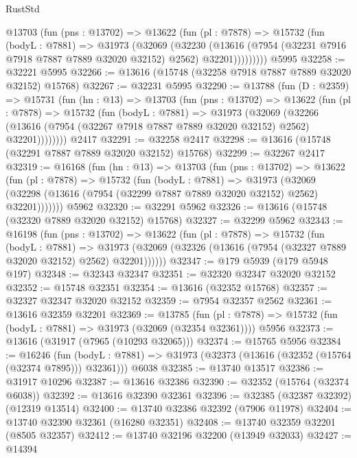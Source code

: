 \begin{lexlean}{RustStd}
\begin{coremodule}
        @13703
          (fun (pns : @13702) =>
          @13622
            (fun (pl : @7878) =>
            @15732
              (fun (bodyL : @7881) =>
              @31973
                (@32069
                  (@32230
                    (@13616
                      (@7954 (@32231 @7916 @7918 @7887 @7889 @32020 @32152) @2562)
                      @32201)))))))))
    @5995
@32258 := @32221 @5995
@32266 := @13616 (@15748 (@32258 @7918 @7887 @7889 @32020 @32152) @15768)
@32267 := @32231 @5995
@32290 := @13788
    (fun (D : @2359) =>
    @15731
      (fun (hn : @13) =>
      @13703
        (fun (pns : @13702) =>
        @13622
          (fun (pl : @7878) =>
          @15732
            (fun (bodyL : @7881) =>
            @31973
              (@32069
                (@32266
                  (@13616 (@7954 (@32267 @7918 @7887 @7889 @32020 @32152) @2562) @32201))))))))
    @2417
@32291 := @32258 @2417
@32298 := @13616 (@15748 (@32291 @7887 @7889 @32020 @32152) @15768)
@32299 := @32267 @2417
@32319 := @16168
    (fun (hn : @13) =>
    @13703
      (fun (pns : @13702) =>
      @13622
        (fun (pl : @7878) =>
        @15732
          (fun (bodyL : @7881) =>
          @31973
            (@32069 (@32298 (@13616 (@7954 (@32299 @7887 @7889 @32020 @32152) @2562) @32201)))))))
    @5962
@32320 := @32291 @5962
@32326 := @13616 (@15748 (@32320 @7889 @32020 @32152) @15768)
@32327 := @32299 @5962
@32343 := @16198
    (fun (pns : @13702) =>
    @13622
      (fun (pl : @7878) =>
      @15732
        (fun (bodyL : @7881) =>
        @31973 (@32069 (@32326 (@13616 (@7954 (@32327 @7889 @32020 @32152) @2562) @32201))))))
@32347 := @179 @5939 (@179 @5948 @197)
@32348 := @32343 @32347
@32351 := @32320 @32347 @32020 @32152
@32352 := @15748 @32351
@32354 := @13616 (@32352 @15768)
@32357 := @32327 @32347 @32020 @32152
@32359 := @7954 @32357 @2562
@32361 := @13616 @32359 @32201
@32369 := @13785
    (fun (pl : @7878) => @15732 (fun (bodyL : @7881) => @31973 (@32069 (@32354 @32361))))
    @5956
@32373 := @13616 (@31917 (@7965 (@10293 @32065)))
@32374 := @15765 @5956
@32384 := @16246
    (fun (bodyL : @7881) => @31973 (@32373 (@13616 (@32352 (@15764 (@32374 @7895))) @32361)))
    @6038
@32385 := @13740 @13517
@32386 := @31917 @10296
@32387 := @13616 @32386
@32390 := @32352 (@15764 (@32374 @6038))
@32392 := @13616 @32390 @32361
@32396 := @32385 (@32387 @32392) (@12319 @13514)
@32400 := @13740 @32386 @32392 (@7906 @11978)
@32404 := @13740 @32390 @32361 (@16280 @32351)
@32408 := @13740 @32359 @32201 (@8505 @32357)
@32412 := @13740 @32196 @32200 (@13949 @32033)
@32427 := @14394

\end{coremodule}
\end{lexlean}
